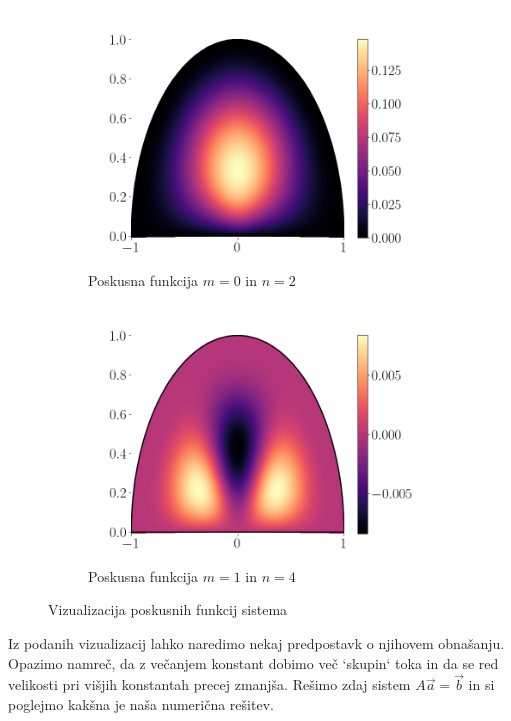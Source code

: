 \documentclass{article}
\begin{document}
\begin{figure}[H]
    \centering
    \begin{subfigure}[b]{0.49\textwidth}
        \centering
        \includegraphics[width=\linewidth]{pretok0-2.png}
		\caption{Poskusna funkcija $m=0$ in $n=2$}
    \end{subfigure}
    \hfill
    \begin{subfigure}[b]{0.49\textwidth}
        \centering
        \includegraphics[width=\linewidth]{pretok1-4.png}
        \caption{Poskusna funkcija $m=1$ in $n=4$}
    \end{subfigure}
    \caption{Vizualizacija poskusnih funkcij sistema}
\end{figure}
Iz podanih vizualizacij lahko naredimo nekaj predpostavk o njihovem obnašanju. Opazimo namreč, da z večanjem konstant dobimo več `skupin` toka in da se red velikosti pri višjih konstantah precej zmanjša. Rešimo zdaj sistem $A\vec{a}=\vec{b}$ in si poglejmo kakšna je naša numerična rešitev.
\end{document}
